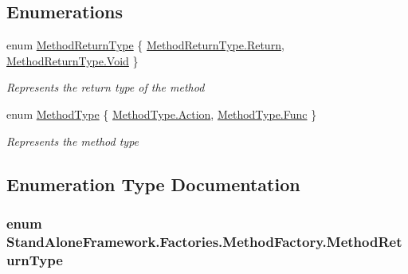 \subsection*{Enumerations}
\begin{DoxyCompactItemize}
\item 
enum \hyperlink{namespace_stand_alone_framework_1_1_factories_1_1_method_factory_a03ffbf0d8e733b86d0ac29ae38dd4241}{Method\+Return\+Type} \{ \hyperlink{namespace_stand_alone_framework_1_1_factories_1_1_method_factory_a03ffbf0d8e733b86d0ac29ae38dd4241a988fd738de9c6d177440c5dcf69e73ce}{Method\+Return\+Type.\+Return}, 
\hyperlink{namespace_stand_alone_framework_1_1_factories_1_1_method_factory_a03ffbf0d8e733b86d0ac29ae38dd4241a81ceb48a978444906d80119200aa358d}{Method\+Return\+Type.\+Void}
 \}
\begin{DoxyCompactList}\small\item\em Represents the return type of the method \end{DoxyCompactList}\item 
enum \hyperlink{namespace_stand_alone_framework_1_1_factories_1_1_method_factory_aeb6e05dc016e73b072faae5a5d275f6a}{Method\+Type} \{ \hyperlink{namespace_stand_alone_framework_1_1_factories_1_1_method_factory_aeb6e05dc016e73b072faae5a5d275f6aa004bf6c9a40003140292e97330236c53}{Method\+Type.\+Action}, 
\hyperlink{namespace_stand_alone_framework_1_1_factories_1_1_method_factory_aeb6e05dc016e73b072faae5a5d275f6aa00d0b4f2d7dcdaaef835b97cf5d1e0df}{Method\+Type.\+Func}
 \}
\begin{DoxyCompactList}\small\item\em Represents the method type \end{DoxyCompactList}\end{DoxyCompactItemize}


\subsection{Enumeration Type Documentation}
\hypertarget{namespace_stand_alone_framework_1_1_factories_1_1_method_factory_a03ffbf0d8e733b86d0ac29ae38dd4241}{
\subsubsection[{Method\+Return\+Type}]{\setlength{\rightskip}{0pt plus 5cm}enum {\bf Stand\+Alone\+Framework.\+Factories.\+Method\+Factory.\+Method\+Return\+Type}}}\label{namespace_stand_alone_framework_1_1_factories_1_1_method_factory_a03ffbf0d8e733b86d0ac29ae38dd4241}


